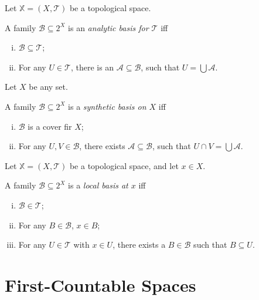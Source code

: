 \begin{definition}
	\label{def: analytic basis}
	Let $\mathbb X = (X, \mathcal T)$ be a topological space.
	
	A family $\mathcal B \subseteq 2^X$ is an \textit{analytic basis for $\mathcal T$} iff
	\begin{enumerate}[(i)]
		\item $\mathcal B \subseteq \mathcal T$;
		\item For any $U \in \mathcal T$, there is an $\mathcal A \subseteq \mathcal B$, such that $U = \bigcup \mathcal A$.
	\end{enumerate}
\end{definition}


\begin{definition}
	\label{def: synthetic basis}
	Let $X$ be any set.
	
	A family $\mathcal B \subseteq 2^X$ is a \textit{synthetic basis on $X$} iff
	\begin{enumerate}[(i)]
		\item $\mathcal B$ is a cover fir $X$;
		\item For any $U, V \in \mathcal B$, there exists $\mathcal A \subseteq \mathcal B$, such that $U \cap V = \bigcup \mathcal A$.
	\end{enumerate}
\end{definition}


\begin{definition}
	\label{def: local basis}
	Let $\mathbb X = (X, \mathcal T)$ be a topological space, and let $x \in X$.
	
	A family $\mathcal B \subseteq 2^X$ is a \textit{local basis at $x$} iff
	\begin{enumerate}[(i)]
		\item $\mathcal B \in \mathcal T$;
		\item For any $B \in \mathcal B$, $x \in B$;
		\item For any $U \in \mathcal T$ with $x \in U$, there exists a $B \in \mathcal B$ such that $B \subseteq U$.
	\end{enumerate}
\end{definition}


\section{First-Countable Spaces}


